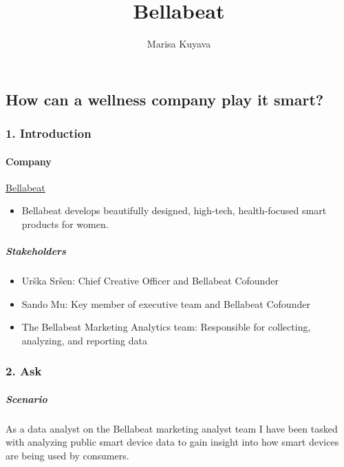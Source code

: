 \documentclass[
]{article}
\title{Bellabeat}
\author{Marisa Kuyava}
\date{}
\providecommand{\tightlist}{%
  \setlength{\itemsep}{0pt}\setlength{\parskip}{0pt}}
\begin{document}
\maketitle

\subsection{\texorpdfstring{\textbf{How can a wellness company play it
smart?}}{How can a wellness company play it smart?}}\label{how-can-a-wellness-company-play-it-smart}

\subsubsection{\texorpdfstring{\textbf{1.
Introduction}}{1. Introduction}}\label{introduction}

\paragraph{\texorpdfstring{\textbf{Company}}{Company}}\label{company}

\href{https://bellabeat.com/}{Bellabeat}

\begin{itemize}
\tightlist
\item
  Bellabeat develops beautifully designed, high-tech, health-focused
  smart products for women.
\end{itemize}

\subparagraph{\texorpdfstring{\textbf{Stakeholders}}{Stakeholders}}\label{stakeholders}

\begin{itemize}
\tightlist
\item
  Urška Sršen: Chief Creative Officer and Bellabeat Cofounder
\item
  Sando Mu: Key member of executive team and Bellabeat Cofounder
\item
  The Bellabeat Marketing Analytics team: Responsible for collecting,
  analyzing, and reporting data
\end{itemize}

\subsubsection{\texorpdfstring{\textbf{2. Ask}}{2. Ask}}\label{ask}

\subparagraph{\texorpdfstring{\textbf{Scenario}}{Scenario}}\label{scenario}

As a data analyst on the Bellabeat marketing analyst team I have been
tasked with analyzing public smart device data to gain insight into how
smart devices are being used by consumers.
\end{document}
